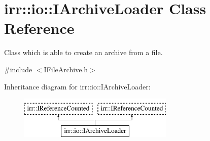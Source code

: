 \hypertarget{classirr_1_1io_1_1IArchiveLoader}{}\section{irr\+:\+:io\+:\+:I\+Archive\+Loader Class Reference}
\label{classirr_1_1io_1_1IArchiveLoader}


Class which is able to create an archive from a file.  




{\ttfamily \#include $<$I\+File\+Archive.\+h$>$}

Inheritance diagram for irr\+:\+:io\+:\+:I\+Archive\+Loader\+:\begin{figure}[H]
\begin{center}
\leavevmode
\includegraphics[height=2.000000cm]{classirr_1_1io_1_1IArchiveLoader}
\end{center}
\end{figure}
